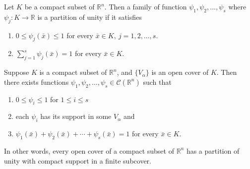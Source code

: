 \begin{remark}
	Let $K$ be a compact subset of $\mathbb{R}^n$.
	Then a family of function $\psi_1,\psi_2,\dots,\psi_s$ where $\psi_j : K \to \mathbb{R}$ is a partition of unity if it satisfies
	\begin{enumerate}
		\item $0 \le \psi_j(\bar{x}) \le 1$ for every $\bar{x} \in K,\ j = 1,2,\dots, s$.
		\item $\sum\limits_{j=1}^s \psi_j(\bar{x}) = 1$ for every $\bar{x} \in K$.
	\end{enumerate}
\end{remark}
\begin{theorem}
	Suppose $K$ is a compact subset of $\mathbb{R}^n$, and $\{V_\alpha\}$ is an open cover of $K$.
	Then there exists functions $\psi_1,\psi_2,\dots,\psi_s \in \mathscr{C}(\mathbb{R}^n)$ such that
	\begin{enumerate}
		\item $0 \le \psi_i \le 1$ for $1 \le i \le s$
		\item each $\psi_i$ has its support in some $V_\alpha$ and
		\item $\psi_1(\bar{x}) + \psi_2(\bar{x}) + \dotsb + \psi_s(\bar{x}) = 1$ for every $\bar{x} \in K$.
	\end{enumerate}
	\begin{commentary}
		In other words, every open cover of a compact subset of $\mathbb{R}^n$ has a partition of unity with compact support in a finite subcover.
	\end{commentary}
\end{theorem}
